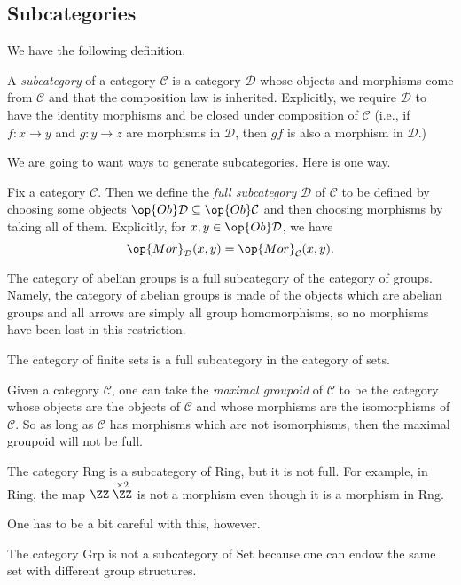 \documentclass[../notes.tex]{subfiles}
\begin{document}
\subsection{Subcategories}
We have the following definition.
\begin{definition}[Subcategory]
	A \textit{subcategory} of a category $\mathcal C$ is a category $\mathcal D$ whose objects and morphisms come from $\mathcal C$ and that the composition law is inherited. Explicitly, we require $\mathcal D$ to have the identity morphisms and be closed under composition of $\mathcal C$ (i.e., if $f:x\to y$ and $g:y\to z$ are morphisms in $\mathcal D$, then $gf$ is also a morphism in $\mathcal D$.)
\end{definition}
We are going to want ways to generate subcategories. Here is one way.
\begin{definition}
	Fix a category $\mathcal C$. Then we define the \textit{full subcategory} $\mathcal D$ of $\mathcal C$ to be defined by choosing some objects $\op{Ob}\mathcal D\subseteq\op{Ob}\mathcal C$ and then choosing morphisms by taking all of them. Explicitly, for $x,y\in\op{Ob}\mathcal D$, we have
	\[\op{Mor}_\mathcal D(x,y)=\op{Mor}_\mathcal C(x,y).\]
\end{definition}
\begin{example}
	The category of abelian groups is a full subcategory of the category of groups. Namely, the category of abelian groups is made of the objects which are abelian groups and all arrows are simply all group homomorphisms, so no morphisms have been lost in this restriction.
\end{example}
\begin{example}
	The category of finite sets is a full subcategory in the category of sets.
\end{example}
\begin{example}
	Given a category $\mathcal C$, one can take the \textit{maximal groupoid} of $\mathcal C$ to be the category whose objects are the objects of $\mathcal C$ and whose morphisms are the isomorphisms of $\mathcal C$. So as long as $\mathcal C$ has morphisms which are not isomorphisms, then the maximal groupoid will not be full.
\end{example}
\begin{example}
	The category $\mathrm{Rng}$ is a subcategory of $\mathrm{Ring}$, but it is not full. For example, in $\mathrm{Ring}$, the map $\ZZ\stackrel{\times2}\ZZ$ is not a morphism even though it is a morphism in $\mathrm{Rng}$.
\end{example}
One has to be a bit careful with this, however.
\begin{nex}
	The category $\mathrm{Grp}$ is not a subcategory of $\mathrm{Set}$ because one can endow the same set with different group structures.
\end{nex}
\end{document}
